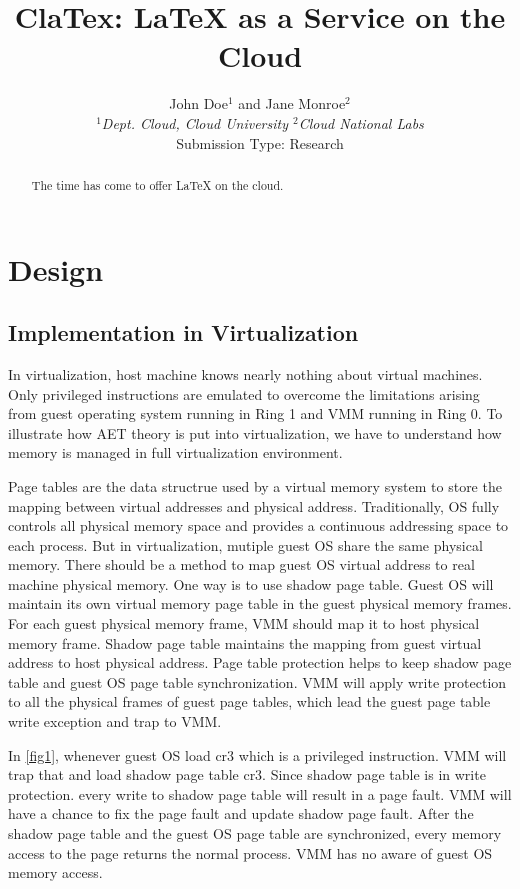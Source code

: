\documentclass[10pt,twocolumn]{article}
\begin{document}
	
	\title{ClaTex: LaTeX as a Service on the Cloud}
	\author{John Doe$^1$ and Jane Monroe$^2$ \\
		\small {\em  $^1$Dept. Cloud, Cloud University \quad
			$^2$Cloud National Labs} \\ [2mm]
		\small Submission Type: Research
	}
	\date{}
	\maketitle
	
	\begin{abstract}
		The time has come to offer LaTeX on the cloud.
	\end{abstract}
	
	\section{Design}
	\subsection{Implementation in Virtualization}
	In virtualization, host machine knows nearly nothing about virtual machines. Only privileged instructions are emulated to overcome the limitations arising from guest operating system running in Ring 1 and VMM running in Ring 0\cite{MasteringKVM}. To illustrate how AET theory is put into virtualization, we have to understand how memory is managed in full virtualization environment.
	
	Page tables are the data structrue used by a virtual memory system to store the mapping between virtual addresses and physical address. Traditionally, OS fully controls all physical memory space and provides a continuous addressing space to each process. But in virtualization, mutiple guest OS share the same physical memory. There should be a method to map guest OS virtual address to real machine physical memory. One way is to use shadow page table. Guest OS will maintain its own virtual memory page table in the guest physical memory frames. For each guest physical memory frame, VMM should map it to host physical memory frame. Shadow page table maintains the mapping from guest virtual address to host physical address. Page table protection helps to keep shadow page table and guest OS page table synchronization. VMM will apply write protection to all the physical frames of guest page tables, which lead the guest page table write exception and trap to VMM.

	
	In \ref{fig1}, whenever guest OS load cr3 which is a privileged instruction. VMM will trap that and load shadow page table cr3. Since shadow page table is in write protection. every write to shadow page table will result in a page fault. VMM will have a chance to fix the page fault and update shadow page fault. After the shadow page table and the guest OS page table are synchronized, every memory access to the page returns the normal process. VMM has no aware of guest OS memory access.
	
	
	
	
	
	
\end{document}
